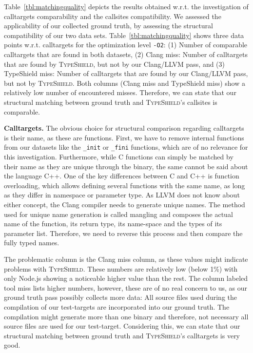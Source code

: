 Table~\ref{tbl:matchingquality} depicts the results obtained w.r.t. the investigation of calltargets comparability and the callsites compatibility.
We assessed the applicability of our collected ground truth, by assessing the structural compatibility of our two data sets. 
Table~\ref{tbl:matchingquality} shows three data points w.r.t. calltargets for the optimization level \texttt{-O2}:
(1) Number of comparable calltargets that are found in both datasets, 
(2) Clang miss: Number of calltargets that are found by \textsc{TypeShield}, but not by our Clang/LLVM pass, and 
(3) TypeShield miss: Number of calltargets that are found by our Clang/LLVM pass, but not by \textsc{TypeShield}.
Both columns (Clang miss and TypeShield miss) show a relatively low number of encountered misses. Therefore, we can 
state that our structural matching between ground truth and \textsc{TypeShield}'s callsites is comparable.

\textbf{Calltargets.} The obvious choice for structural comparison regarding calltargets is their name, as these are functions. First, we have to remove internal 
functions from our datasets like the \texttt{\_init} or \texttt{\_fini} functions, which are of no relevance for this investigation. Furthermore, while C functions can
simply be matched by their name as they are unique through the binary, the same cannot be said about the language C++. One of the key differences between C and C++ is 
function overloading, which allows defining several functions with the same name, as long as they differ in namespace or parameter type. 
As LLVM does not know about either concept, the Clang compiler needs to generate unique names. The method used for unique name generation is called mangling and composes
the actual name of the function, its return type, its name-space and the types of its parameter list. Therefore, we need to reverse this process and then compare the fully
typed names. 

The problematic column is the Clang miss column, as these values might indicate problems with \textsc{TypeShield}. These numbers are relatively low (below 1\%) with only Node.js
showing a noticeable higher value than the rest. The column labeled tool miss lists higher numbers, however, these are of no real concern to us, as our ground truth 
pass possibly collects more data: All source files used during the compilation of our test-targets are incorporated into our ground truth. The compilation might generate more than
one binary and therefore, not necessary all source files are used for our test-target.
Considering this, we can state that our structural matching between ground truth and \textsc{TypeShield}'s calltargets is very good.

